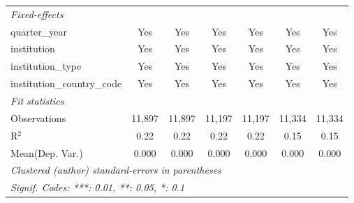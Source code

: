 \begin{tabular}{lcccccc}
   \midrule
   \emph{Fixed-effects}\\
   quarter\_year                      & Yes      & Yes        & Yes      & Yes       & Yes      & Yes\\  
   institution                        & Yes      & Yes        & Yes      & Yes       & Yes      & Yes\\  
   institution\_type                  & Yes      & Yes        & Yes      & Yes       & Yes      & Yes\\  
   institution\_country\_code         & Yes      & Yes        & Yes      & Yes       & Yes      & Yes\\  
   \midrule
   \emph{Fit statistics}\\
   Observations                       & 11,897   & 11,897     & 11,197   & 11,197    & 11,334   & 11,334\\  
   R$^2$                              & 0.22     & 0.22       & 0.22     & 0.22      & 0.15     & 0.15\\  
Mean(Dep. Var.) & 0.000 & 0.000 & 0.000 & 0.000 & 0.000 & 0.000 \\
   \midrule \midrule
   \multicolumn{7}{l}{\emph{Clustered (author) standard-errors in parentheses}}\\
   \multicolumn{7}{l}{\emph{Signif. Codes: ***: 0.01, **: 0.05, *: 0.1}}\\
\end{tabular}
\par\endgroup
